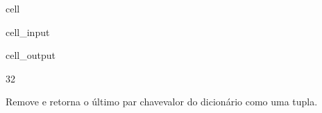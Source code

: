 \documentclass[letterpaper,10pt,english]{jupyterBook}
\begin{document}
\begin{sphinxuseclass}{cell}\begin{sphinxVerbatimInput}

\begin{sphinxuseclass}{cell_input}
\begin{sphinxVerbatim}[commandchars=\\\{\}]
     
  
\end{sphinxVerbatim}

\end{sphinxuseclass}\end{sphinxVerbatimInput}
\begin{sphinxVerbatimOutput}

\begin{sphinxuseclass}{cell_output}
\begin{sphinxVerbatim}[commandchars=\\\{\}]
32
\end{sphinxVerbatim}

\end{sphinxuseclass}\end{sphinxVerbatimOutput}

\end{sphinxuseclass}
\sphinxAtStartPar
{}
Remove e retorna o último par chave\sphinxhyphen{}valor do dicionário como uma tupla.
\end{document}
